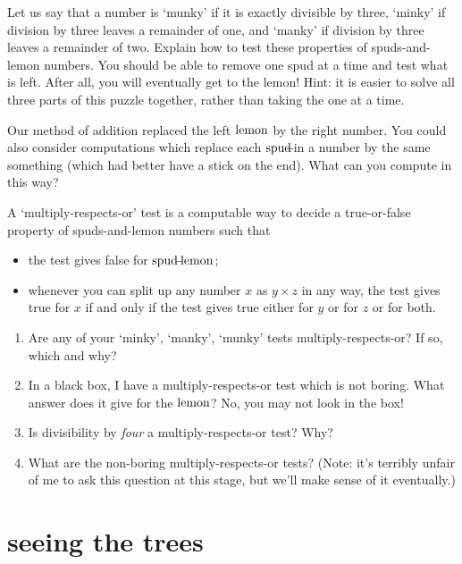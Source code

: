 \documentclass{book}
\begin{document}
\begin{puz}
 Let us say that a number is `munky' if it is exactly divisible by three, `minky' if division by three leaves a remainder of one, and `manky' if division by three leaves a remainder of two. Explain how to test these properties of spuds-and-lemon numbers. You should be able to remove one spud at a time and test what is left. After all, you will eventually get to the lemon! Hint: it is easier to solve all three parts of this puzzle together, rather than taking the one at a time.
\end{puz}

\begin{puz}
Our method of addition replaced the left $\mbox{lemon}$ by the right number. You could also consider computations which replace each $\mbox{spud}\!\!\!-\!\!\!$ in a number by the same something (which had better have a stick on the end). What can you compute in this way?
\end{puz}

\begin{puz}
  A `multiply-respects-or' test is a computable way to decide a true-or-false property of spuds-and-lemon numbers such that
  \begin{itemize}
  \item the test gives false for $\mbox{spud}\!\!\!-\!\!\!\mbox{lemon}$;
  \item whenever you can split up any number $x$ as $y\times z$ in any way, the test gives true for $x$ if and only if the test gives true either for $y$ or for $z$ or for both.
  \end{itemize}
  \begin{enumerate}
  \item Are any of your `minky', `manky', `munky' tests multiply-respects-or? If so, which and why?
  \item In a black box, I have a multiply-respects-or test which is not boring. What answer does it give for the $\mbox{lemon}$? No, you may not look in the box!
  \item Is divisibility by \emph{four} a multiply-respects-or test? Why?
  \item What are the non-boring multiply-respects-or tests? (Note: it's terribly unfair of me to ask this question at this stage, but we'll make sense of it eventually.)
  \end{enumerate}
\end{puz}




\chapter{seeing the trees}
\end{document}
